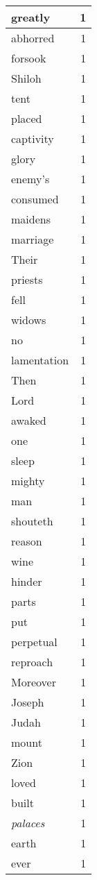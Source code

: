 \begin{center}
\begin{longtable}{l|r}
greatly & 1\\ \hline 
abhorred & 1\\ \hline 
forsook & 1\\ \hline 
Shiloh & 1\\ \hline 
tent & 1\\ \hline 
placed & 1\\ \hline 
captivity & 1\\ \hline 
glory & 1\\ \hline 
enemy's & 1\\ \hline 
consumed & 1\\ \hline 
maidens & 1\\ \hline 
marriage & 1\\ \hline 
Their & 1\\ \hline 
priests & 1\\ \hline 
fell & 1\\ \hline 
widows & 1\\ \hline 
no & 1\\ \hline 
lamentation & 1\\ \hline 
Then & 1\\ \hline 
Lord & 1\\ \hline 
awaked & 1\\ \hline 
one & 1\\ \hline 
sleep & 1\\ \hline 
mighty & 1\\ \hline 
man & 1\\ \hline 
shouteth & 1\\ \hline 
reason & 1\\ \hline 
wine & 1\\ \hline 
hinder & 1\\ \hline 
parts & 1\\ \hline 
put & 1\\ \hline 
perpetual & 1\\ \hline 
reproach & 1\\ \hline 
Moreover & 1\\ \hline 
Joseph & 1\\ \hline 
Judah & 1\\ \hline 
mount & 1\\ \hline 
Zion & 1\\ \hline 
loved & 1\\ \hline 
built & 1\\ \hline 
\emph{palaces} & 1\\ \hline 
earth & 1\\ \hline 
ever & 1\\ \hline 

\end{longtable}
\end{center}
